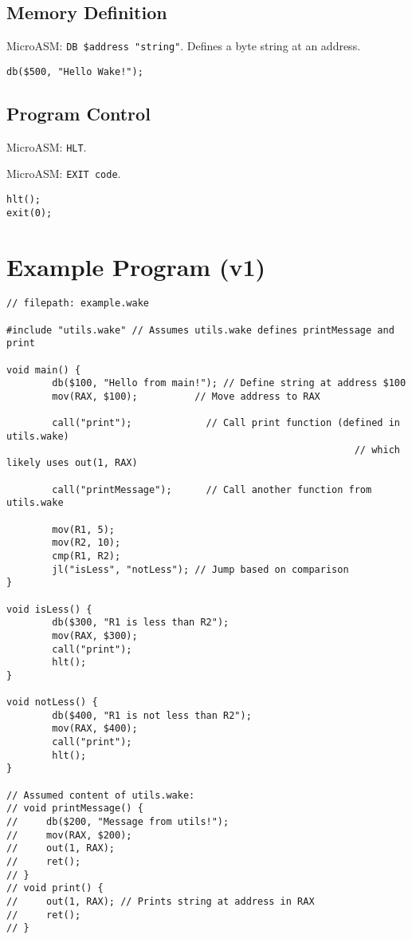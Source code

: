 \documentclass[a4paper,11pt]{book}
\begin{document}
\subsection{Memory Definition}
\begin{description}[style=nextline]
		\item[\texttt{db(address, "string")}] MicroASM: \texttt{DB \$address "string"}. Defines a byte string at an address.
\end{description}
\begin{lstlisting}[language=Wake]
db($500, "Hello Wake!");
\end{lstlisting}

\subsection{Program Control}
\begin{description}[style=nextline]
	\item[\texttt{hlt()}] MicroASM: \texttt{HLT}.
	\item[\texttt{exit(code)}] MicroASM: \texttt{EXIT code}.
\end{description}
\begin{lstlisting}[language=Wake]
hlt();
exit(0);
\end{lstlisting}

\section{Example Program (v1)}
\begin{lstlisting}[language=Wake,caption={Example Wake program}]
// filepath: example.wake

#include "utils.wake" // Assumes utils.wake defines printMessage and print

void main() {
		db($100, "Hello from main!"); // Define string at address $100
		mov(RAX, $100);          // Move address to RAX

		call("print");             // Call print function (defined in utils.wake)
															 // which likely uses out(1, RAX)

		call("printMessage");      // Call another function from utils.wake

		mov(R1, 5);
		mov(R2, 10);
		cmp(R1, R2);
		jl("isLess", "notLess"); // Jump based on comparison
}

void isLess() {
		db($300, "R1 is less than R2");
		mov(RAX, $300);
		call("print");
		hlt();
}

void notLess() {
		db($400, "R1 is not less than R2");
		mov(RAX, $400);
		call("print");
		hlt();
}

// Assumed content of utils.wake:
// void printMessage() {
//     db($200, "Message from utils!");
//     mov(RAX, $200);
//     out(1, RAX);
//     ret();
// }
// void print() {
//     out(1, RAX); // Prints string at address in RAX
//     ret();
// }
\end{lstlisting}
\end{document}
